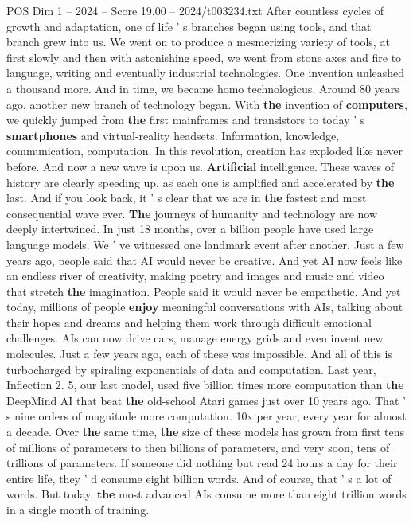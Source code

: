 \begin{textsample}{POS Dim 1 – 2024 – Score 19.00 – 2024/t003234.txt}
After countless cycles of growth and adaptation, one of life ' s branches began using tools, and that branch grew into us.
We went on to produce a mesmerizing variety of tools, at first slowly and then with astonishing speed, we went from stone axes and fire to language, writing and eventually industrial technologies.
One invention unleashed a thousand more.
And in time, we became homo technologicus.
Around 80 years ago, another new branch of technology began.
With \textbf{the} invention of \textbf{computers}, we quickly jumped from \textbf{the} first mainframes and transistors to today ' s \textbf{smartphones} and virtual-reality headsets.
Information, knowledge, communication, computation.
In this revolution, creation has exploded like never before.
And now a new wave is upon us. \textbf{Artificial} intelligence.
These waves of history are clearly speeding up, as each one is amplified and accelerated by \textbf{the} last.
And if you look back, it ' s clear that we are in \textbf{the} fastest and most consequential wave ever. \textbf{The} journeys of humanity and technology are now deeply intertwined.
In just 18 months, over a billion people have used large language models.
We ' ve witnessed one landmark event after another.
Just a few years ago, people said that AI would never be creative.
And yet AI now feels like an endless river of creativity, making poetry and images and music and video that stretch \textbf{the} imagination.
People said it would never be empathetic.
And yet today, millions of people \textbf{enjoy} meaningful conversations with AIs, talking about their hopes and dreams and helping them work through difficult emotional challenges.
AIs can now drive cars, manage energy grids and even invent new molecules.
Just a few years ago, each of these was impossible.
And all of this is turbocharged by spiraling exponentials of data and computation.
Last year, Inflection 2. 5, our last model, used five billion times more computation than \textbf{the} DeepMind AI that beat \textbf{the} old-school Atari games just over 10 years ago.
That ' s nine orders of magnitude more computation. 10x per year, every year for almost a decade.
Over \textbf{the} same time, \textbf{the} size of these models has grown from first tens of millions of parameters to then billions of parameters, and very soon, tens of trillions of parameters.
If someone did nothing but read 24 hours a day for their entire life, they ' d consume eight billion words.
And of course, that ' s a lot of words.
But today, \textbf{the} most advanced AIs consume more than eight trillion words in a single month of training.

\end{textsample}
